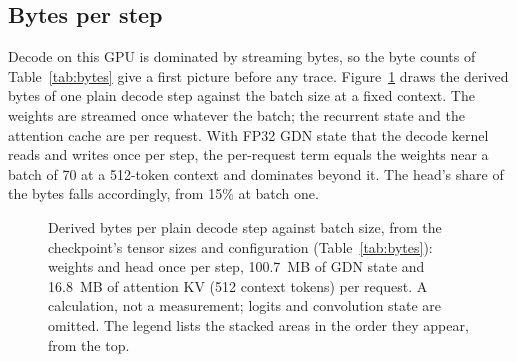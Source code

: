 \subsection{Bytes per step}\label{sec:time-bytes}
Decode on this GPU is dominated by streaming bytes, so the byte counts of Table~\ref{tab:bytes} give a first picture before any trace. Figure~\ref{fig:bytes-derived} draws the derived bytes of one plain decode step against the batch size at a fixed context. The weights are streamed once whatever the batch; the recurrent state and the attention cache are per request. With FP32 GDN state that the decode kernel reads and writes once per step, the per-request term equals the weights near a batch of 70 at a 512-token context and dominates beyond it. The head's share of the bytes falls accordingly, from 15\% at batch one.

\begin{figure}[tbp]
\centering
{}
\caption{Derived bytes per plain decode step against batch size, from the checkpoint's tensor sizes and configuration (Table~\ref{tab:bytes}): weights and head once per step, 100.7~MB of GDN state and 16.8~MB of attention KV (512 context tokens) per request. A calculation, not a measurement; logits and convolution state are omitted. The legend lists the stacked areas in the order they appear, from the top.}
\label{fig:bytes-derived}
\end{figure}

